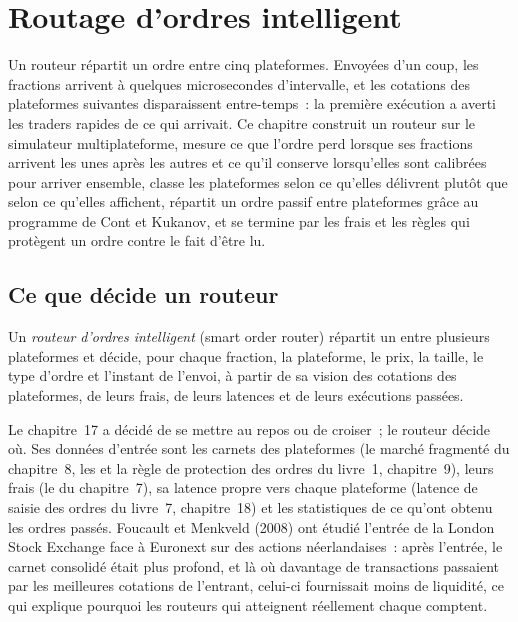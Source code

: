 \chapter{Routage d'ordres intelligent}\label{ch:mx:smart-order-routing}

Un routeur répartit un ordre entre cinq plateformes. Envoyées d'un coup, les fractions arrivent à quelques microsecondes d'intervalle, et les cotations des plateformes suivantes disparaissent entre-temps~:
la première exécution a averti les traders rapides de ce qui arrivait. Ce chapitre construit un routeur sur le simulateur multiplateforme, mesure ce que l'ordre perd lorsque ses
fractions arrivent les unes après les autres et ce qu'il conserve lorsqu'elles sont calibrées pour arriver ensemble, classe les plateformes selon ce qu'elles délivrent plutôt que selon ce qu'elles
affichent, répartit un ordre passif entre plateformes grâce au programme de Cont et Kukanov, et se termine par les frais et les règles qui protègent un ordre contre le fait
d'être lu.

\section{Ce que décide un routeur}

\begin{definition}\label{def:mx:smart-order-routing:sor}
Un \emph{routeur d'ordres intelligent} (smart order router) répartit un  entre plusieurs plateformes et décide, pour chaque fraction, la plateforme, le prix, la taille,
le type d'ordre et l'instant de l'envoi, à partir de sa vision des cotations des plateformes, de leurs frais, de leurs latences et de leurs exécutions passées.
\end{definition}

Le chapitre~17 a décidé de se mettre au repos ou de croiser~; le routeur décide où. Ses données d'entrée sont les carnets des plateformes (le marché fragmenté du chapitre~8, les  et la règle de protection des ordres du livre~1, chapitre~9), leurs frais (le  du chapitre~7), sa latence propre vers chaque plateforme
(latence de saisie des ordres du livre~7, chapitre~18) et les statistiques de ce qu'ont obtenu les ordres passés. Foucault et Menkveld (2008) ont étudié l'entrée de la
London Stock Exchange face à Euronext sur des actions néerlandaises~: après l'entrée, le carnet consolidé était plus profond, et là où davantage de transactions passaient par les
meilleures cotations de l'entrant, celui-ci fournissait moins de liquidité, ce qui explique pourquoi les routeurs qui atteignent réellement chaque  comptent.

